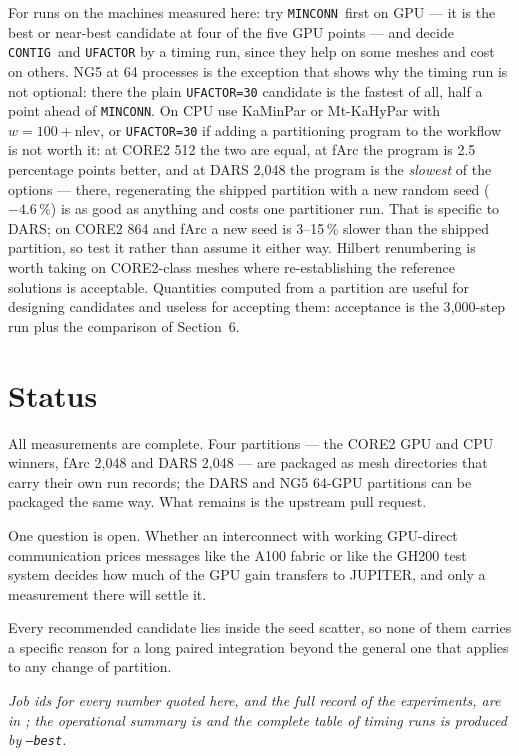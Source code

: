 \documentclass[11pt,a4paper]{article}
\newcommand{\minconn}{\texttt{MINCONN}}
\newcommand{\contig}{\texttt{CONTIG}}
\begin{document}
For runs on the machines measured here: try \minconn\ first on GPU --- it is the best or
near-best candidate at four of the five GPU points --- and decide \contig\ and \texttt{UFACTOR}
by a timing run, since they help on some meshes and cost on others. NG5 at 64 processes is the
exception that shows why the timing run is not optional: there the plain \texttt{UFACTOR=30}
candidate is the fastest of all, half a point ahead of \minconn. On CPU
use KaMinPar or Mt-KaHyPar with $w = 100 + \mathrm{nlev}$, or \texttt{UFACTOR=30} if adding a
partitioning program to the workflow is not worth it: at CORE2 512 the two are equal, at fArc
the program is 2.5 percentage points better, and at DARS 2{,}048 the program is the
\emph{slowest} of the options --- there, regenerating the shipped partition with a new random
seed ($-4.6\,\%$) is as good as anything and costs one partitioner run. That is specific to
DARS; on CORE2 864 and fArc a new seed is 3--15\,\% slower than the shipped partition, so test
it rather than assume it either way. Hilbert renumbering is worth taking on
CORE2-class meshes where re-establishing the reference solutions is acceptable. Quantities
computed from a partition are useful for designing candidates and useless for accepting them:
acceptance is the 3{,}000-step run plus the comparison of Section~6.

\section{Status}

All measurements are complete. Four partitions --- the CORE2 GPU and CPU winners, fArc 2{,}048
and DARS 2{,}048 --- are packaged as mesh directories that carry their own run records; the
DARS and NG5 64-GPU partitions can be packaged the same way. What remains is the upstream pull
request.

One question is open. Whether an interconnect with working GPU-direct communication prices
messages like the A100 fabric or like the GH200 test system decides how much of the GPU gain
transfers to JUPITER, and only a measurement there will settle it.

Every recommended candidate lies inside the seed scatter, so none of them carries a specific
reason for a long paired integration beyond the general one that applies to any change of
partition.

\vspace{4pt}
\noindent\textit{Job ids for every number quoted here, and the full record of the experiments,
are in ; the operational summary is
 and the complete table of timing runs is produced by
 \texttt{--best}.}
\end{document}
